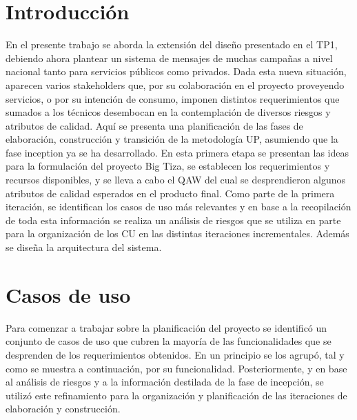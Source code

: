 \documentclass[a4paper, 10pt, twoside]{article}
\begin{document}
\newpage

\tableofcontents

\newpage



\section{Introducción}

En el presente trabajo se aborda la extensión del diseño presentado en el TP1, debiendo ahora plantear un sistema de mensajes de muchas campañas a nivel nacional tanto para servicios públicos como privados. Dada esta nueva situación, aparecen varios stakeholders que, por su colaboración en el proyecto proveyendo servicios, o por su intención de consumo, imponen distintos requerimientos que sumados a los técnicos desembocan en la contemplación de diversos riesgos y atributos de calidad.
Aquí se presenta una planificación de las fases de elaboración, construcción y transición de la metodología UP, asumiendo que la fase inception ya se ha desarrollado. En esta primera etapa se presentan las ideas para la formulación del proyecto Big Tiza, se establecen los requerimientos y recursos disponibles, y se lleva a cabo el QAW del cual se desprendieron algunos atributos de calidad esperados en el producto final. Como parte de la primera iteración, se identifican los casos de uso más relevantes y en base a la recopilación de toda esta información se realiza un análisis de riesgos que se utiliza en parte para la organización de los CU en las distintas iteraciones incrementales. Además se diseña la arquitectura del sistema.

\newpage


\section{Casos de uso}
Para comenzar a trabajar sobre la planificación del proyecto se identificó un conjunto de casos de uso que cubren la mayoría de las funcionalidades que se desprenden de los requerimientos obtenidos. En un principio se los agrupó, tal y como se muestra a continuación, por su funcionalidad. Posteriormente, y en base al análisis de riesgos y a la información destilada de la fase de incepción, se utilizó este refinamiento para la organización y planificación de las iteraciones de elaboración y construcción.
\end{document}

